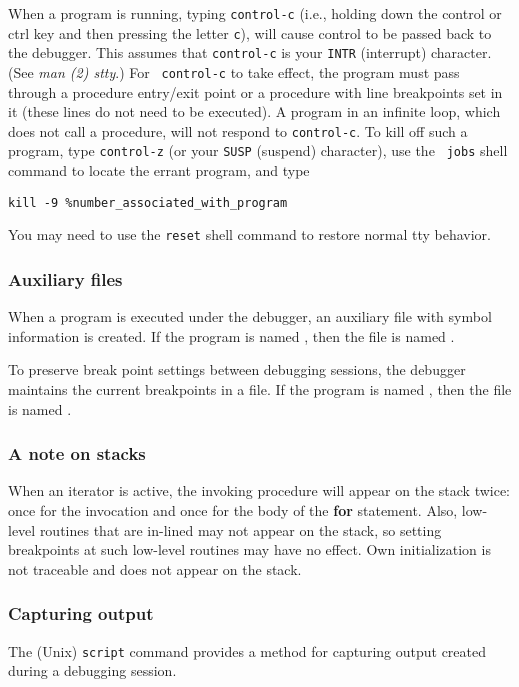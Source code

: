 When a program is running, typing {\tt control-c} (i.e., holding down the
control or ctrl key and then pressing the letter {\tt c}), will cause control
to be passed back to the debugger.  This assumes that {\tt control-c} is your
{\tt INTR} (interrupt) character. (See {\em man (2) stty}.)  For {\tt
control-c} to take effect, the program must pass through a procedure entry/exit
point or a procedure with line breakpoints set in it (these lines do not need
to be executed).  A program in an infinite loop, which does not call a
procedure, will not respond to {\tt control-c}.  To kill off such a program,
type {\tt control-z} (or your {\tt SUSP} (suspend) character), use the {\tt
jobs} shell command to locate the errant program, and type
\begin{verbatim}
kill -9 %number_associated_with_program
\end{verbatim}
You may need to use the {\tt reset} shell command to restore normal tty
behavior.

\subsubsection{Auxiliary files}

When a program is executed under the debugger, an auxiliary file with symbol
information is created.  If the program is named , then the file is
named .

To preserve break point settings between debugging sessions, the debugger
maintains the current breakpoints in a file.  If the program is named
, then the file is named .

\subsubsection{A note on stacks}

When an iterator is active, the invoking procedure will appear on the stack
twice: once for the invocation and once for the body of the {\bf for}
statement.  Also, low-level routines that are in-lined may not appear on the
stack, so setting breakpoints at such low-level routines may have no effect.
Own initialization is not traceable and does not appear on the stack.

\subsubsection{Capturing output}

The (Unix) {\tt script} command provides a method for capturing output created
during a debugging session.

